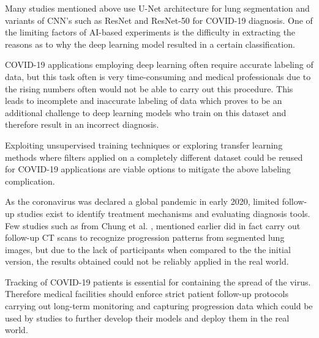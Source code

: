 Many studies mentioned above use U-Net architecture for lung segmentation and variants of CNN's such as ResNet and ResNet-50 for COVID-19 diagnosis. One of the limiting factors of AI-based experiments is the difficulty in extracting the reasons as to why the deep learning model resulted in a certain classification. 

COVID-19 applications employing deep learning often require accurate 
labeling of data, but this task often is very time-consuming and medical 
professionals due to the rising numbers often would not be able to carry out 
this procedure. This leads to incomplete and inaccurate labeling of data which 
proves to be an additional challenge to deep learning models who train on this 
dataset and therefore result in an incorrect diagnosis.

Exploiting unsupervised training techniques \cite{NVF+2018, DGE2015} or exploring transfer learning methods \cite{TFK+2018}
where filters applied on a completely different dataset could be 
reused for COVID-19 applications are viable options to mitigate the above labeling 
complication.

As the coronavirus was declared a global pandemic in early 2020, limited 
follow-up studies exist to identify treatment mechanisms and 
evaluating diagnosis tools. Few studies such as from Chung et al. \cite{CMA+2020}, mentioned earlier 
did in fact carry out follow-up CT scans to recognize progression patterns from 
segmented lung images, but due to the lack of participants when compared to the 
the initial version, the results obtained could not be reliably applied in the real world.


Tracking of COVID-19 patients is essential for containing 
the spread of the virus. Therefore medical facilities should enforce 
strict patient follow-up protocols carrying out long-term monitoring and capturing 
progression data which could be used by studies to further develop their models 
and deploy them in the real world. 

